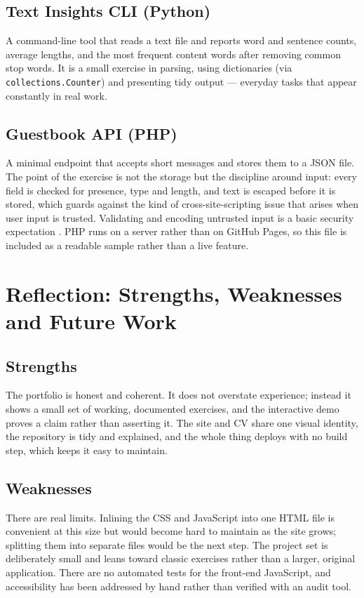 \documentclass[11pt,a4paper]{article}
\begin{document}
\subsection{Text Insights CLI (Python)}
A command-line tool that reads a text file and reports word and sentence counts, average
lengths, and the most frequent content words after removing common stop words. It is a
small exercise in parsing, using dictionaries (via \texttt{collections.Counter}) and
presenting tidy output --- everyday tasks that appear constantly in real work.

\subsection{Guestbook API (PHP)}
A minimal endpoint that accepts short messages and stores them to a JSON file. The point
of the exercise is not the storage but the discipline around input: every field is
checked for presence, type and length, and text is escaped before it is stored, which
guards against the kind of cross-site-scripting issue that arises when user input is
trusted. Validating and encoding untrusted input is a basic security expectation
\citep{owasp2021}. PHP runs on a server rather than on GitHub Pages, so this file is
included as a readable sample rather than a live feature.

\section{Reflection: Strengths, Weaknesses and Future Work}

\subsection{Strengths}
The portfolio is honest and coherent. It does not overstate experience; instead it shows
a small set of working, documented exercises, and the interactive demo proves a claim
rather than asserting it. The site and CV share one visual identity, the repository is
tidy and explained, and the whole thing deploys with no build step, which keeps it easy
to maintain.

\subsection{Weaknesses}
There are real limits. Inlining the CSS and JavaScript into one HTML file is convenient
at this size but would become hard to maintain as the site grows; splitting them into
separate files would be the next step. The project set is deliberately small and leans
toward classic exercises rather than a larger, original application. There are no
automated tests for the front-end JavaScript, and accessibility has been addressed by
hand rather than verified with an audit tool.
\end{document}
